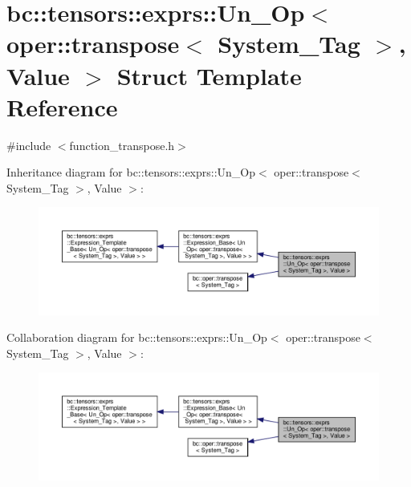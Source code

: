 \hypertarget{structbc_1_1tensors_1_1exprs_1_1Un__Op_3_01oper_1_1transpose_3_01System__Tag_01_4_00_01Value_01_4}{}\section{bc\+:\+:tensors\+:\+:exprs\+:\+:Un\+\_\+\+Op$<$ oper\+:\+:transpose$<$ System\+\_\+\+Tag $>$, Value $>$ Struct Template Reference}
\label{structbc_1_1tensors_1_1exprs_1_1Un__Op_3_01oper_1_1transpose_3_01System__Tag_01_4_00_01Value_01_4}


{\ttfamily \#include $<$function\+\_\+transpose.\+h$>$}



Inheritance diagram for bc\+:\+:tensors\+:\+:exprs\+:\+:Un\+\_\+\+Op$<$ oper\+:\+:transpose$<$ System\+\_\+\+Tag $>$, Value $>$\+:\nopagebreak
\begin{figure}[H]
\begin{center}
\leavevmode
\includegraphics[width=350pt]{structbc_1_1tensors_1_1exprs_1_1Un__Op_3_01oper_1_1transpose_3_01System__Tag_01_4_00_01Value_01_4__inherit__graph}
\end{center}
\end{figure}


Collaboration diagram for bc\+:\+:tensors\+:\+:exprs\+:\+:Un\+\_\+\+Op$<$ oper\+:\+:transpose$<$ System\+\_\+\+Tag $>$, Value $>$\+:\nopagebreak
\begin{figure}[H]
\begin{center}
\leavevmode
\includegraphics[width=350pt]{structbc_1_1tensors_1_1exprs_1_1Un__Op_3_01oper_1_1transpose_3_01System__Tag_01_4_00_01Value_01_4__coll__graph}
\end{center}
\end{figure}
